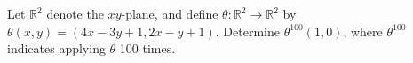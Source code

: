 Let $\mathbb{R}^2$ denote the $xy$-plane, and define $\theta : \mathbb{R}^2 \to
\mathbb{R}^2$ by $\theta(x, y) = (4x - 3y + 1, 2x - y + 1)$. Determine
$\theta^{100}(1, 0)$, where $\theta^{100}$ indicates applying $\theta$ 100
times.
